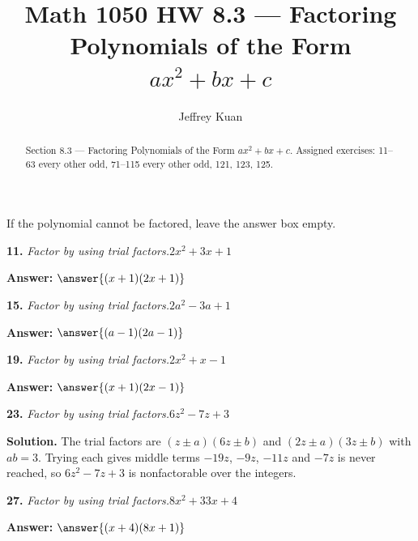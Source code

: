 \documentclass{ximera}
\author{Jeffrey Kuan}
\title{Math 1050 HW 8.3 --- Factoring Polynomials of the Form $ax^2 + bx + c$}
\begin{document}
\begin{abstract}
    Section 8.3 --- Factoring Polynomials of the Form $ax^2 + bx + c$.
    Assigned exercises: 11–63 every other odd, 71–115 every other odd, 121, 123, 125.
\end{abstract}

\maketitle

If the polynomial cannot be factored, leave the answer box empty.


\begin{problem}
\textbf{11.} \emph{Factor by using trial factors.}\quad $2x^2 + 3x + 1$

\textbf{Answer:} $\answer{(x +1)(2x +1)}$
\end{problem}

\begin{problem}
\textbf{15.} \emph{Factor by using trial factors.}\quad $2a^2 - 3a + 1$

\textbf{Answer:} $\answer{(a -1)(2a -1)}$
\end{problem}

\begin{problem}
\textbf{19.} \emph{Factor by using trial factors.}\quad $2x^2 + x - 1$

\textbf{Answer:} $\answer{(x +1)(2x -1)}$
\end{problem}

\begin{problem}
\textbf{23.} \emph{Factor by using trial factors.}\quad $6z^2 - 7z + 3$

\begin{multipleChoice}
\end{multipleChoice}

\begin{hint}
\textbf{Solution.} The trial factors are $(z\pm a)(6z\pm b)$ and $(2z\pm a)(3z\pm b)$ with $ab=3$. Trying each gives middle terms $-19z$, $-9z$, $-11z$ and $-7z$ is never reached, so $6z^2-7z+3$ is nonfactorable over the integers.
\end{hint}
\end{problem}

\begin{problem}
\textbf{27.} \emph{Factor by using trial factors.}\quad $8x^2 + 33x + 4$

\textbf{Answer:} $\answer{(x +4)(8x +1)}$
\end{problem}
\end{document}
